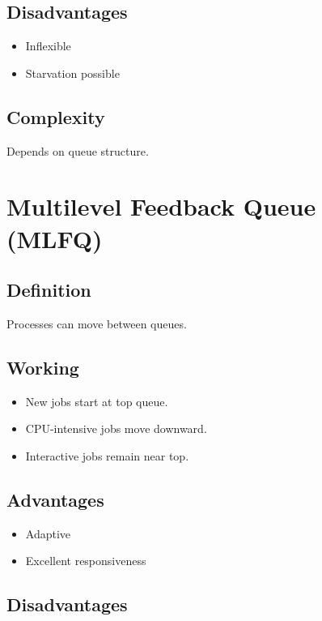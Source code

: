 \subsection{Disadvantages}

\begin{itemize}
\item Inflexible
\item Starvation possible
\end{itemize}

\subsection{Complexity}

Depends on queue structure.

\section{Multilevel Feedback Queue (MLFQ)}

\subsection{Definition}

Processes can move between queues.

\subsection{Working}

\begin{itemize}
\item New jobs start at top queue.
\item CPU-intensive jobs move downward.
\item Interactive jobs remain near top.
\end{itemize}

\subsection{Advantages}

\begin{itemize}
\item Adaptive
\item Excellent responsiveness
\end{itemize}

\subsection{Disadvantages}

